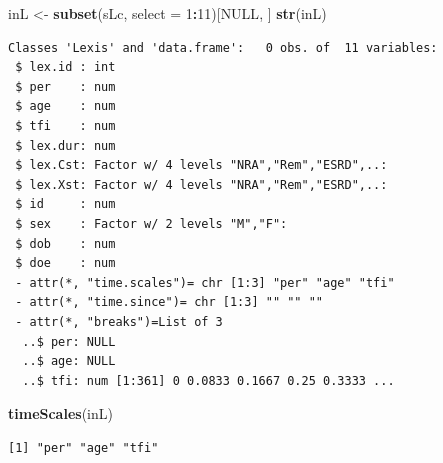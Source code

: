 \documentclass[
]{book}
\newenvironment{Shaded}{\begin{snugshade}}{\end{snugshade}}
\newcommand{\AttributeTok}[1]{\textcolor[rgb]{0.13,0.29,0.53}{#1}}
\newcommand{\ConstantTok}[1]{\textcolor[rgb]{0.56,0.35,0.01}{#1}}
\newcommand{\DecValTok}[1]{\textcolor[rgb]{0.00,0.00,0.81}{#1}}
\newcommand{\FunctionTok}[1]{\textcolor[rgb]{0.13,0.29,0.53}{\textbf{#1}}}
\newcommand{\NormalTok}[1]{#1}
\newcommand{\OtherTok}[1]{\textcolor[rgb]{0.56,0.35,0.01}{#1}}
\newcommand{\SpecialCharTok}[1]{\textcolor[rgb]{0.81,0.36,0.00}{\textbf{#1}}}
\theoremstyle{definition}
\theoremstyle{definition}
\theoremstyle{definition}
\theoremstyle{definition}
\theoremstyle{remark}
\begin{document}
\begin{enumerate}
\begin{Shaded}
\begin{Highlighting}[]
\NormalTok{inL }\OtherTok{\textless{}{-}} \FunctionTok{subset}\NormalTok{(sLc, }\AttributeTok{select =} \DecValTok{1}\SpecialCharTok{:}\DecValTok{11}\NormalTok{)[}\ConstantTok{NULL}\NormalTok{, ]}
\FunctionTok{str}\NormalTok{(inL)}
\end{Highlighting}
\end{Shaded}

\begin{verbatim}
Classes 'Lexis' and 'data.frame':   0 obs. of  11 variables:
 $ lex.id : int 
 $ per    : num 
 $ age    : num 
 $ tfi    : num 
 $ lex.dur: num 
 $ lex.Cst: Factor w/ 4 levels "NRA","Rem","ESRD",..: 
 $ lex.Xst: Factor w/ 4 levels "NRA","Rem","ESRD",..: 
 $ id     : num 
 $ sex    : Factor w/ 2 levels "M","F": 
 $ dob    : num 
 $ doe    : num 
 - attr(*, "time.scales")= chr [1:3] "per" "age" "tfi"
 - attr(*, "time.since")= chr [1:3] "" "" ""
 - attr(*, "breaks")=List of 3
  ..$ per: NULL
  ..$ age: NULL
  ..$ tfi: num [1:361] 0 0.0833 0.1667 0.25 0.3333 ...
\end{verbatim}

\begin{Shaded}
\begin{Highlighting}[]
\FunctionTok{timeScales}\NormalTok{(inL)}
\end{Highlighting}
\end{Shaded}

\begin{verbatim}
[1] "per" "age" "tfi"
\end{verbatim}


\end{enumerate}
\end{document}
